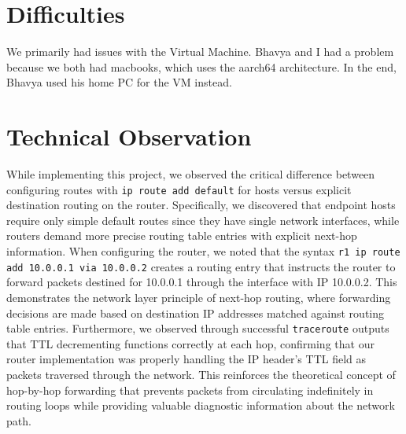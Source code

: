 \documentclass{article}
\begin{document}
\section{Difficulties}

We primarily had issues with the Virtual Machine. Bhavya and I had a problem because we both had macbooks, which uses the aarch64 architecture. In the end, Bhavya used his home PC for the VM instead. 


\section{Technical Observation}
While implementing this project, we observed the critical difference between configuring routes with \texttt{ip route add default} for hosts versus explicit destination routing on the router. Specifically, we discovered that endpoint hosts require only simple default routes since they have single network interfaces, while routers demand more precise routing table entries with explicit next-hop information. When configuring the router, we noted that the syntax \texttt{r1 ip route add 10.0.0.1 via 10.0.0.2} creates a routing entry that instructs the router to forward packets destined for 10.0.0.1 through the interface with IP 10.0.0.2. This demonstrates the network layer principle of next-hop routing, where forwarding decisions are made based on destination IP addresses matched against routing table entries. Furthermore, we observed through successful \texttt{traceroute} outputs that TTL decrementing functions correctly at each hop, confirming that our router implementation was properly handling the IP header's TTL field as packets traversed through the network. This reinforces the theoretical concept of hop-by-hop forwarding that prevents packets from circulating indefinitely in routing loops while providing valuable diagnostic information about the network path.
\end{document}
